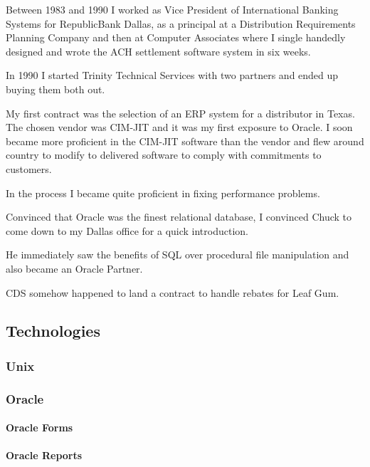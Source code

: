 \documentclass[letterpaper,10pt,english]{sphinxmanual}
\begin{document}
Between 1983 and 1990 I worked as Vice President of International Banking Systems for RepublicBank Dallas, as a principal at a Distribution Requirements Planning Company and then at Computer Associates where I single handedly designed and wrote the ACH settlement software system in six weeks.

In 1990 I started Trinity Technical Services with two partners and ended up buying them both out.

My first contract was the selection of an ERP system for a distributor in Texas.  The chosen vendor was CIM-JIT and it was my first exposure to Oracle. I soon
became more proficient in the CIM-JIT software than the vendor and flew around
country to modify to delivered software to comply with commitments to customers.

In the process I became quite proficient in fixing performance problems.

Convinced that Oracle was the finest relational database, I convinced Chuck to
come down to my Dallas office for a quick introduction.

He immediately saw the benefits of SQL over procedural file manipulation and
also became an Oracle Partner.

CDS somehow happened to land a contract to handle rebates for Leaf Gum.


\subsection{Technologies}
\label{\detokenize{Contributions:technologies}}

\subsubsection{Unix}
\label{\detokenize{Contributions:unix}}

\subsubsection{Oracle}
\label{\detokenize{Contributions:id1}}

\paragraph{Oracle Forms}
\label{\detokenize{Contributions:oracle-forms}}

\paragraph{Oracle Reports}
\label{\detokenize{Contributions:oracle-reports}}
\end{document}
